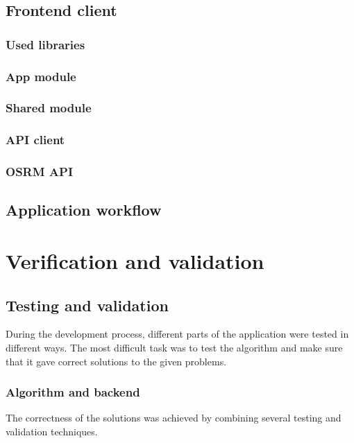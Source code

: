 \documentclass[a4paper,twoside,12pt]{book}
\begin{document}
\section{Frontend client}

\subsection{Used libraries}

\subsection{App module}

\subsection{Shared module}

\subsection{API client}

\subsection{OSRM API}

\section{Application workflow}


\chapter{Verification and validation}
\section{Testing and validation}
During the development process, different parts of the application were tested in different ways. The most difficult task was to test the algorithm and make sure that it gave correct solutions to the given problems. 
\subsection{Algorithm and backend}
The correctness of the solutions was achieved by combining several testing and validation techniques.
\end{document}
